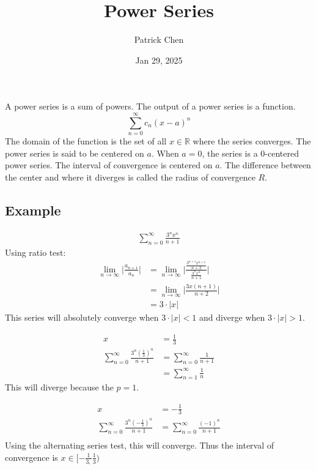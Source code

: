 \documentclass{article}
\title{Power Series}
\author{Patrick Chen}
\date{Jan 29, 2025}
\theoremstyle{mytheoremstyle}
\theoremstyle{mytheoremstyle}
\theoremstyle{myproblemstyle}
\begin{document}
    \maketitle
    A power series is a sum of powers. The output of a power series is a
    function.
    \[
        \sum_{n=0}^{\infty} c_n (x-a)^n
    \]
    The domain of the function is the set of all $x\in \mathbb{R}$ where the
    series converges. The power series is said to be centered on $a$. When $a=0$, the
    series is a 0-centered power series. The interval of convergence is centered
    on $a$. The difference between the center and where it diverges is called
    the radius of convergence $R$.

    \subsection*{Example}
    \begin{align*}
        \sum_{n=0}^{\infty} \frac{3^nx^n}{n+1}
    \end{align*}
    Using ratio test:
    \begin{align*}
        \lim_{n\to \infty} \Big|\frac{a_{n+1}}{a_n}\Big|
        &= \lim_{n\to \infty}
        \bigg|\frac{\frac{3^{n+1}x^{n+1}}{n+2}} {\frac{3^nx^n}{n+1}}\bigg| \\
        &= \lim_{n\to \infty} \Big|\frac{3x(n+1)} {n+2}\Big| \\
        &= 3\cdot|x|
    \end{align*}
    This series will absolutely converge when $3\cdot|x| < 1$ and diverge when
    $3\cdot|x|>1$.

    \begin{align*}
        x &= \frac{1}{3} \\
        \sum_{n=0}^{\infty} \frac{3^n (\frac{1}{3})^n}{n+1}
        &= \sum_{n=0}^{\infty} \frac{1}{n+1} \\
        &= \sum_{n=1}^{\infty} \frac{1}{n}
    \end{align*}
    This will diverge because the $p=1$.

    \begin{align*}
        x &= -\frac{1}{3} \\
        \sum_{n=0}^{\infty} \frac{3^n (-\frac{1}{3})^n}{n+1}
        &= \sum_{n=0}^{\infty} \frac{(-1)^n}{n+1} \\
    \end{align*}
    Using the alternating series test, this will converge. Thus the interval of
    convergence is $x\in[-\frac{1}{3,} \frac{1}{3})$
\end{document}

